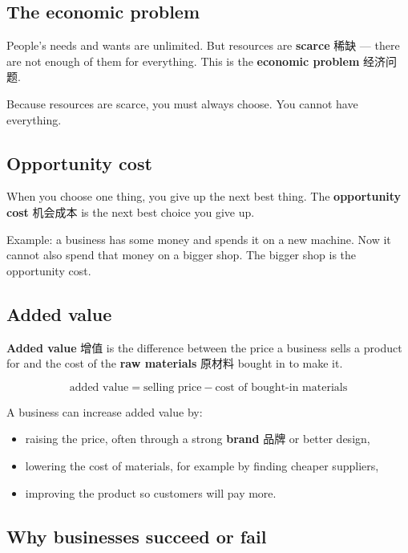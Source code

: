 \documentclass[11pt]{article}
\begin{document}
\subsection*{The economic problem}

People's needs and wants are unlimited. But resources are \textbf{scarce} 稀缺 — there are not enough of them for everything. This is the \textbf{economic problem} 经济问题.

Because resources are scarce, you must always choose. You cannot have everything.

\subsection*{Opportunity cost}

When you choose one thing, you give up the next best thing. The \textbf{opportunity cost} 机会成本 is the next best choice you give up.

Example: a business has some money and spends it on a new machine. Now it cannot also spend that money on a bigger shop. The bigger shop is the opportunity cost.

\subsection*{Added value}

\textbf{Added value} 增值 is the difference between the price a business sells a product for and the cost of the \textbf{raw materials} 原材料 bought in to make it.

\[
\text{added value} = \text{selling price} - \text{cost of bought-in materials}
\]

A business can increase added value by:

\begin{itemize}
\item raising the price, often through a strong \textbf{brand} 品牌 or better design,

\item lowering the cost of materials, for example by finding cheaper suppliers,

\item improving the product so customers will pay more.

\end{itemize}

\subsection*{Why businesses succeed or fail}
\end{document}
